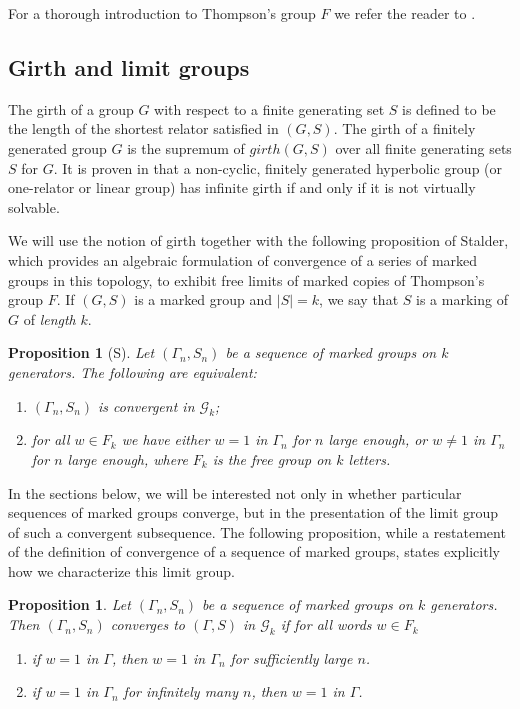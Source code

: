 \documentclass[11pt]{amsart}
\newtheorem{proposition}[theorem]{Proposition}
\begin{document}
For a thorough introduction to Thompson's group $F$ we refer the reader to \cite{CFP}.

\subsection{Girth and limit groups}

The girth of a group $G$ with respect to a finite generating set
$S$ is defined to be the length of the shortest relator satisfied
in $(G,S)$.  The girth of a finitely generated group $G$ is the
supremum of $girth(G,S)$ over all finite generating sets $S$ for
$G$.  It is proven in \cite{Ak} that a non-cyclic, finitely
generated hyperbolic group (or one-relator or linear group) has
infinite girth if and only if it is not virtually solvable.

We will use the notion of girth together with the following proposition of Stalder, which provides
 an algebraic formulation of convergence of a series of marked groups in this topology, to exhibit free limits of marked copies of Thompson's group $F$.
If $(G,S)$ is a marked group and $|S| = k$, we say that $S$ is a marking of $G$ of {\em length} $k$.

\begin{proposition}[\lbrack S\rbrack]\label{prop:stalder}
Let $(\Gamma_n,S_n)$ be a sequence of marked groups on $k$ generators.  The following are equivalent:
\begin{enumerate}\item $(\Gamma_n,S_n)$ is convergent in ${\mathcal G}_k$;
\item for all $w \in F_k$ we have either $w=1$ in $\Gamma_n$ for $n$ large enough, or $w \neq 1$ in $\Gamma_n$ for $n$ large enough, where $F_k$ is the free group on $k$ letters.
\end{enumerate}
\end{proposition}

In the sections below, we will be interested not only in whether particular
sequences of marked groups converge, but in the presentation of the limit group of such a
convergent subsequence.  The following proposition, while a restatement of the definition
of convergence of a sequence of marked groups, states explicitly how we characterize this limit group.

\begin{proposition}\label{convergence to anything}
Let $(\Gamma_n,S_n)$ be a sequence of marked groups on $k$
generators. Then $(\Gamma_n,S_n)$ converges to $(\Gamma,S)$ in
${\mathcal G}_k$ if for all words $w \in F_k$
\begin{enumerate}
\item if $w=1$ in $\Gamma$, then $w=1$ in $\Gamma_n$ for
sufficiently large $n$. \item if $w =1$ in $\Gamma_n$ for
infinitely many $n$, then $w=1$ in $\Gamma$.
\end{enumerate}
\end{proposition}
\end{document}
